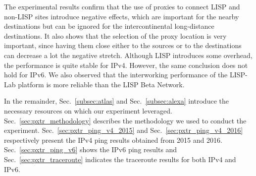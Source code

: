 The experimental results confirm that the use of proxies to connect LISP and non-LISP sites introduce negative effects, which are important for the nearby destinations but can be ignored for the intercontinental long-distance destinations. It also shows that the selection of the proxy location is very important, since having them close either to the sources or to the destinations can decrease a lot the negative stretch. Although LISP introduces some overhead, the performance is quite stable for IPv4. However, the same conclusion does not hold for IPv6. We also observed that the interworking performance of the LISP-Lab platform is more reliable than the LISP Beta Network.

In the remainder, Sec.~\ref{subsec:atlas} and Sec.~\ref{subsec:alexa} introduce the necessary resources on which our experiment leveraged. Sec.~\ref{sec:pxtr_methodology} describes the methodology we used to conduct the experiment. Sec.~\ref{sec:pxtr_ping_v4_2015} and Sec.~\ref{sec:pxtr_ping_v4_2016} respectively present the IPv4 ping results obtained from 2015 and 2016. Sec.~\ref{sec:pxtr_ping_v6} shows the IPv6 ping results and Sec.~\ref{sec:pxtr_traceroute} indicates the traceroute results for both IPv4 and IPv6. %

